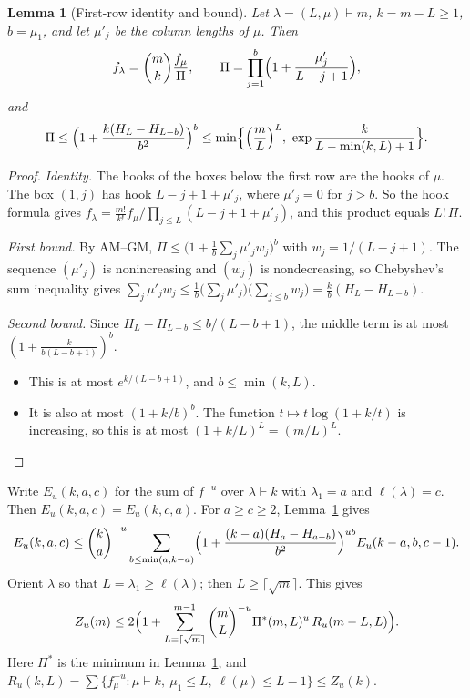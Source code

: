 \documentclass[11pt]{amsart}
\newtheorem{lemma}[theorem]{Lemma}
\theoremstyle{remark}
\begin{document}
\begin{lemma}[First-row identity and bound]\label{lem:B}
Let $\lambda=(L,\mu)\vdash m$, $k=m-L\ge1$, $b=\mu_1$, and let $\mu'_j$ be the column lengths of $\mu$. Then
\[f_\lambda=\binom mk\frac{f_\mu}{\Pi},\qquad \Pi=\prod_{j=1}^{b}\Bigl(1+\frac{\mu'_j}{L-j+1}\Bigr),\]
and
\[\Pi\le\Bigl(1+\frac{k(H_L-H_{L-b})}{b^2}\Bigr)^b\le\min\Bigl\{\Bigl(\frac mL\Bigr)^L,\ \exp\frac{k}{L-\min(k,L)+1}\Bigr\}.\]
\end{lemma}
\begin{proof}
\emph{Identity.} The hooks of the boxes below the first row are the hooks of $\mu$. The box $(1,j)$ has
hook $L-j+1+\mu'_j$, where $\mu'_j=0$ for $j>b$. So the hook formula gives
$f_\lambda=\frac{m!}{k!}f_\mu/\prod_{j\le L}(L-j+1+\mu'_j)$, and this product equals $L!\,\Pi$.

\emph{First bound.} By AM--GM,
$\Pi\le\bigl(1+\frac1b\sum_j\mu'_jw_j\bigr)^b$ with $w_j=1/(L-j+1)$. The sequence $(\mu'_j)$ is
nonincreasing and $(w_j)$ is nondecreasing, so Chebyshev's sum inequality gives
$\sum_j\mu'_jw_j\le\frac1b\bigl(\sum_j\mu'_j\bigr)\bigl(\sum_{j\le b}w_j\bigr)=\frac kb(H_L-H_{L-b})$.

\emph{Second bound.} Since $H_L-H_{L-b}\le b/(L-b+1)$, the middle term is at most
$(1+\frac{k}{b(L-b+1)})^b$.
\begin{itemize}
\item This is at most $e^{k/(L-b+1)}$, and $b\le\min(k,L)$.
\item It is also at most $(1+k/b)^b$. The function $t\mapsto t\log(1+k/t)$ is increasing, so this is at most
$(1+k/L)^L=(m/L)^L$.\qedhere
\end{itemize}
\end{proof}

Write $E_u(k,a,c)$ for the sum of $f^{-u}$ over $\lambda\vdash k$ with $\lambda_1=a$ and $\ell(\lambda)=c$. Then
$E_u(k,a,c)=E_u(k,c,a)$. For $a\ge c\ge2$, Lemma~\ref{lem:B} gives
\begin{equation}\label{eq:dpB}
E_u(k,a,c)\le\binom ka^{-u}\sum_{b\le\min(a,k-a)}\Bigl(1+\frac{(k-a)(H_a-H_{a-b})}{b^2}\Bigr)^{ub}E_u(k-a,b,c-1).
\end{equation}
Orient $\lambda$ so that $L=\lambda_1\ge\ell(\lambda)$; then $L\ge\lceil\sqrt m\rceil$. This gives
\begin{equation}\label{eq:1dB}
Z_u(m)\le2\Bigl(1+\sum_{L=\lceil\sqrt m\rceil}^{m-1}\binom mL^{-u}\Pi^*(m,L)^u\,R_u(m-L,L)\Bigr).
\end{equation}
Here $\Pi^*$ is the minimum in Lemma~\ref{lem:B}, and
$R_u(k,L)=\sum\{f_\mu^{-u}:\mu\vdash k,\ \mu_1\le L,\ \ell(\mu)\le L-1\}\le Z_u(k)$.
\end{document}
